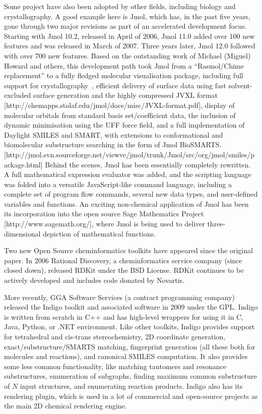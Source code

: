 \documentclass[10pt]{bmc_article}
\newenvironment{bmcformat}{\begin{raggedright}\baselineskip20pt\sloppy\setboolean{publ}{false}}{\end{raggedright}\baselineskip20pt\sloppy}
\begin{document}
\begin{bmcformat}
Some project have also been adopted by other fields, including biology
and crystallography. A good example
here is Jmol, which has, in the past five years, gone through two major revisions
as part of an accelerated development focus. Starting with Jmol 10.2, released in
April of 2006, Jmol 11.0 added over 100 new features and was released in March of
2007. Three years later, Jmol 12.0 followed with over 700 new features.
Based on the outstanding work of Michael (Miguel) Howard and others, this development
path took Jmol from a ``Rasmol/Chime replacement'' to a fully fledged molecular
visualisation package, including full support for crystallography~\cite{Hanson2010},
efficient delivery of surface data using fast solvent-excluded surface
generation and the highly compressed JVXL format [http://chemapps.stolaf.edu/jmol/docs/misc/JVXL-format.pdf],
 display of molecular orbitals from standard basis set/coefficient data,
the inclusion of dynamic minimisation using the UFF force field, and
a full implementation of Daylight SMILES and SMART, with extensions to
conformational and biomolecular substructure searching in the form of Jmol
BioSMARTS.[http://jmol.svn.sourceforge.net/viewvc/jmol/trunk/Jmol/src/org/jmol/smiles/package.html]
Behind the scenes, Jmol has been essentially completely rewritten. A full
mathematical expression evaluator was added, and the scripting language
was folded into a versatile JavaScript-like command language, including a
complete set of program flow commands, several new data types, and
user-defined variables and functions. An exciting non-chemical application
of Jmol has been its incorporation into the open source Sage
Mathematics Project [http://www.sagemath.org/], where Jmol is being used
to deliver three-dimensional depiction of mathematical functions. 

Two new Open Source cheminformatics toolkits have appeared since the
original paper. In 2006 Rational Discovery, a cheminformatics service
company (since closed down), released RDKit \cite{WebRDKit} under the
BSD License. RDKit continues to be actively developed and includes
code donated by Novartis.

More recently, GGA Software Services (a contract programming company)
released the Indigo toolkit \cite{WebIndigo} and associated software
in 2009 under the GPL. Indigo is written from scratch in C++ and has
high-level wrappers for using it in C, Java, Python, or .NET
environment. Like other toolkits, Indigo provides support for
tetrahedral and cis-trans stereochemistry, 2D coordinate generation,
exact/substructure/SMARTS matching, fingerprint generation (all these
both for molecules and reactions), and canonical SMILES computation.
It also provides some less common functionality, like matching
tautomers and resonance substructures, enumeration of subgraphs,
finding maximum common substructure of $N$ input structures, and
enumerating reaction products. Indigo also has its rendering plugin,
which is used in a lot of commercial and open-source projects as the
main 2D chemical rendering engine.


\end{bmcformat}
\end{document}
